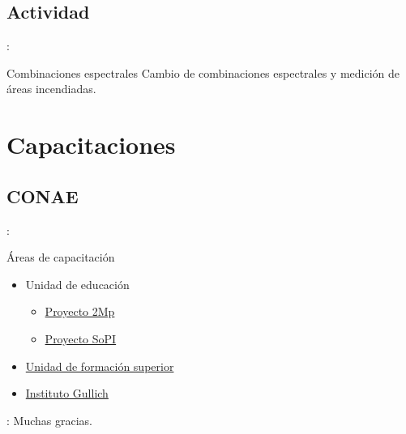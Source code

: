 \documentclass[handout,aspectratio=169]{beamer}
\begin{document}
\subsection{Actividad}

\begin{frame}{\secname : \subsecname}
    \begin{alertblock}{Combinaciones espectrales}
        Cambio de combinaciones espectrales y medición de áreas incendiadas.
    \end{alertblock}
\end{frame}

\section{Capacitaciones}
\subsection{CONAE}
\begin{frame}{\secname : \subsecname}
    \begin{block}{Áreas de capacitación}
    \begin{itemize}
        \item Unidad de educación
        \begin{itemize}
            \item \href{https://2mp.conae.gov.ar}{Proyecto 2Mp}
            \item \href{https://sopi.conae.gov.ar}{Proyecto SoPI}
        \end{itemize}
        \item \href{http://ufs.conae.gov.ar/}{Unidad de formación superior}
        \item \href{http://ig.edu.ar/}{Instituto Gullich}
    \end{itemize}
    \end{block}
\end{frame}

\begin{frame}{\secname : \subsecname}
    \centering
    Muchas gracias.
\end{frame}
\end{document}
